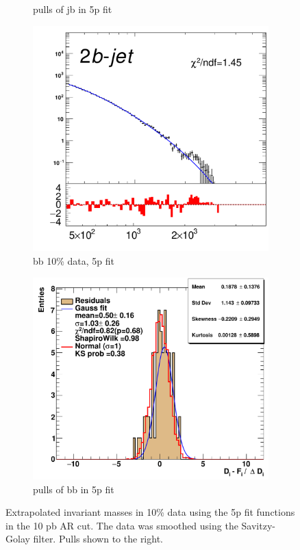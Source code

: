 \begin{figure}[H]
\begin{subfigure}[h]{0.4\linewidth}
    \caption{pulls of jb in 5p fit}
    \end{subfigure}
    \hfill
    \begin{subfigure}[h]{0.38\linewidth}
    \includegraphics[scale=0.3]{figs//app/10data/pub_mass_10per_extrapolate_bb.pdf}%
    \caption{bb 10\% data, 5p fit}
    \end{subfigure}
    \hfill
    \begin{subfigure}[h]{0.4\linewidth}
    \includegraphics[scale=0.32]{figs/app/10data/pub_mass_10per_extrapolate_residuals_bb.pdf}%
    \caption{pulls of bb in 5p fit}
    \end{subfigure}
    \hfill
    \caption{Extrapolated invariant masses in 10\% data using the 5p fit functions in the 10 pb AR cut. The data was smoothed using the Savitzy-Golay filter. Pulls shown to the right.}
\label{fig:10data-fit-pulls-jj}
\end{figure}

